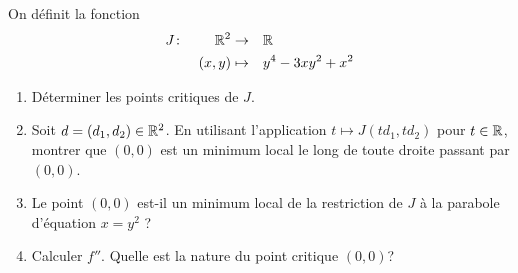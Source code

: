 \documentclass[french,a4paper,10pt]{article}
\begin{document}
	\begin{td-exo}[2]
		On définit la fonction 
			\[\begin{aligned}
				J&\colon&\mathbb{R}^2&\to&&\mathbb{R}\\
				&&(x,y)&\mapsto&& y^4-3xy^2+x^2
			\end{aligned}\]
			
		\begin{enumerate}
			\item Déterminer les points critiques de $J$.
			
			\item Soit $d=(d_1, d_2)\in\mathbb{R}^2$. En utilisant l'application $t\mapsto J(td_1,td_2)$ pour $t\in\mathbb{R}$, montrer que $(0,0)$ est un minimum local le long de toute droite passant par $(0,0)$.
			
			\item Le point $(0,0)$ est-il un minimum local de la restriction de $J$ à la parabole d'équation $x=y^2$ ?
			
			\item Calculer $f''$. Quelle est la nature du point critique $(0,0)$?
		\end{enumerate}
	\end{td-exo}
\end{document}
